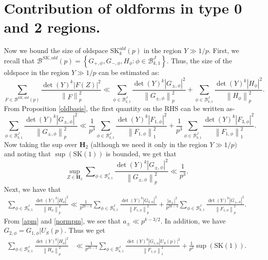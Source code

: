 \documentclass[11pt]{amsart}
\numberwithin{equation}{section}
\theoremstyle{plain}
\theoremstyle{definition}
\newcommand{\mf}{\mathbf}
\newcommand{\mc}{\mathcal}
\newcommand{\mrm}{\mathrm}
\newcommand*{\norm}[1]{\left\lVert#1\right\rVert}
\newcommand{\sumn}{\sum \nolimits}
\newcommand{\skk}{\mrm{SK}_k}
\begin{document}
\section{Contribution of oldforms in type 0 and 2 regions.}\label{old-cont-02}
Now we bound the size of oldspace $\skk^{old}(p)$ in the region $Y\gg 1/p$. First, we recall that $\mc B ^{SK, old}(p)=\left\{ G_{+,\phi}, G_{-,\phi}, H_\phi:  \phi\in \mc B_{k,1}^J\right\}$. Thus, the size of the oldspace in the region $Y\gg 1/p$ can be estimated as:
\begin{equation}
    \sum_{F\in \mc B^{SK, old}(p)}\frac{\det(Y)^k|F(Z)|^2}{\norm{F}^2_p}\ll \sum_{\phi\in \mc B_{k,1}^J}\frac{\det(Y)^k |G_{\pm, \phi}|^2}{\norm{G_{\pm, \phi}}^2_p}+\sum_{\phi\in \mc B_{k,1}^J}\frac{\det(Y)^k |H_{\phi}|^2}{\norm{H_{\phi}}^2_p}.
\end{equation}
From Proposition \ref{oldbasis}, the first quantity on the RHS can be written as-
\begin{equation}
    \sum_{\phi\in \mc B_{k,1}^J}\frac{\det(Y)^k |G_{\pm, \phi}|^2}{\norm{G_{\pm, \phi}}^2_p}\ll \frac{1}{p^3}\sum_{\phi\in \mc B_{k,1}^J}\frac{\det(Y)^k |F_{1, \phi}|^2}{\norm{F_{1, \phi}}^2_1}+\frac{1}{p^3}\sum_{\phi\in \mc B_{k,1}^J}\frac{\det(Y)^k |F_{3, \phi}|^2}{\norm{F_{1, \phi}}^2_1}.%
\end{equation}
Now taking the sup over $\mf H_2$ (although we need it only in the region $Y\gg 1/p)$ and noting that $\sup(\mrm{SK}(1))$ is bounded, we get that
\begin{equation}
    \sup_{Z\in\mf H_2}\sumn_{\phi\in \mc B_{k,1}^J}\frac{\det(Y)^k |G_{\pm, \phi}|^2}{\norm{G_{\pm, \phi}}^2_p}\ll \frac{1}{p^3}.
\end{equation}
Next, we have that
\begin{align}
    \sumn_{\phi\in \mc B_{k,1}^J}\frac{\det(Y)^k |H_{\phi}|^2}{\norm{H_{\phi}}^2_p}\ll \frac{1}{p^{2k-4}}\sumn_{\phi\in \mc B_{k,1}^J}\frac{\det(Y)^k |G_{2,\phi}|^2}{\norm{F_{1,\phi}}^2_p}+\frac{|a_\pm|^2}{p^{2k-4}} \sumn_{\phi\in \mc B_{k,1}^J}\frac{\det(Y)^k |G_{\pm, \phi}|^2}{\norm{F_{1,\phi}}^2_p}.
\end{align}
From \eqref{apm} and \eqref{normpm}, we see that $a_\pm \ll p^{k-3/2}$. In addition, we have $G_{2,\phi}= G_{1,\phi}|U_S(p)$. Thus we get
\begin{align}
    \sumn_{\phi\in \mc B_{k,1}^J}\frac{\det(Y)^k |H_{\phi}|^2}{\norm{H_{\phi}}^2_p}&\ll \frac{1}{p^{2k-1}}\sumn_{\phi\in \mc B_{k,1}^J}\frac{\det(Y)^k |G_{1,\phi}|U_S(p)|^2}{\norm{F_{1,\phi}}^2_1}+\frac{1}{p^2} \sup(\mrm{SK}(1)).
\end{align}
\end{document}
